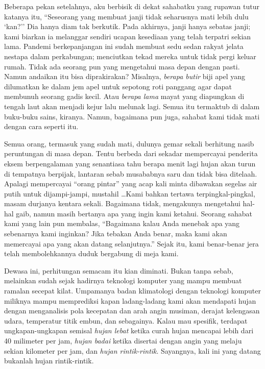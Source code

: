 \documentclass[smalldemyvopaper,11pt,twoside,onecolumn,openright,extrafontsizes]{memoir}
\begin{document}

Beberapa pekan setelahnya, aku berbisik di dekat sahabatku yang rupawan tutur katanya itu, ``Seseorang yang membuat janji tidak seharusnya mati lebih dulu `kan?'' Dia hanya diam tak berkutik. Pada akhirnya, janji hanya sebatas janji; kami biarkan ia melanggar sendiri ucapan kesediaan yang telah terpatri sekian lama. Pandemi berkepanjangan ini sudah membuat sedu sedan rakyat jelata nestapa dalam perkabungan; menciutkan tekad mereka untuk tidak pergi keluar rumah. Tidak ada seorang pun yang mengetahui masa depan dengan pasti. Namun andaikan itu bisa diprakirakan? Misalnya, \textit{berapa butir} biji apel yang dilumatkan ke dalam jem apel untuk sepotong roti panggang agar dapat membunuh seorang gadis kecil. Atau \textit{berapa lama} mayat yang diapungkan di tengah laut akan menjadi kejur lalu melunak lagi. Semua itu termaktub di dalam buku-buku sains, kiranya. Namun, bagaimana pun juga, sahabat kami tidak mati dengan cara seperti itu.


Semua orang, termasuk yang sudah mati, dulunya gemar sekali berhitung nasib peruntungan di masa depan. Tentu berbeda dari sekadar mempercayai penderita eksem berpengalaman yang senantiasa tahu berapa menit lagi hujan akan turun di tempatnya berpijak, lantaran sebab musababnya saru dan tidak bisa ditelaah. Apalagi mempercayai ``orang pintar'' yang acap kali minta dibawakan segelas air putih untuk dijampi-jampi, mustahil \dots Kami bahkan tertawa terpingkal-pingkal, masam durjanya kentara sekali. Bagaimana tidak, mengakunya mengetahui hal-hal gaib, namun masih bertanya apa yang ingin kami ketahui. Seorang sahabat kami yang lain pun membalas, ``Bagaimana kalau Anda menebak apa yang sebenarnya kami inginkan? Jika tebakan Anda benar, maka kami akan memercayai apa yang akan datang selanjutnya.'' Sejak itu, kami benar-benar jera telah membolehkannya duduk bergabung di meja kami.


Dewasa ini, perhitungan semacam itu kian diminati. Bukan tanpa sebab, melainkan sudah sejak hadirnya teknologi komputer yang mampu membuat ramalan secepat kilat. Umpamanya badan klimatologi dengan teknologi komputer miliknya mampu memprediksi kapan ladang-ladang kami akan mendapati hujan dengan menganalisis pola kecepatan dan arah angin musiman, derajat kelengasan udara, temperatur titik embun, dan sebagainya. Kalau mau spesifik, terdapat ungkapan-ungkapan semisal \textit{hujan lebat} ketika curah hujan mencapai lebih dari 40 milimeter per jam, \textit{hujan badai} ketika disertai dengan angin yang melaju sekian kilometer per jam, dan \textit{hujan rintik-rintik}. Sayangnya, kali ini yang datang bukanlah hujan rintik-rintik.
\end{document}
